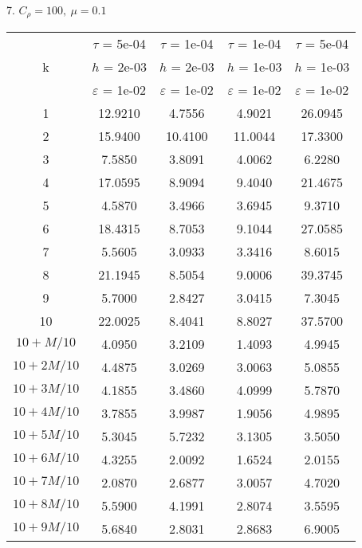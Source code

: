 7. $C_{\rho} = 100, \ \mu = 0.1$
\begin{center}
	\begin{tabular}{ |c|c|c|c|c| } 
		\hline
		& $\tau$ = 5e-04 & $\tau$ = 1e-04 & $\tau$ = 1e-04 & $\tau$ = 5e-04 \\ 
		k & $h$ = 2e-03 & $h$ = 2e-03 & $h$ = 1e-03 & $h$ = 1e-03 \\ 
		& $\varepsilon$ = 1e-02 & $\varepsilon$ = 1e-02 & $\varepsilon$ = 1e-02 & $\varepsilon$ = 1e-02 \\ 
		\hline
		1 & 12.9210 & 4.7556 & 4.9021 & 26.0945 \\
		\hline
		2 & 15.9400 & 10.4100 & 11.0044 & 17.3300 \\
		\hline
		3 & 7.5850 & 3.8091 & 4.0062 & 6.2280 \\
		\hline
		4 & 17.0595 & 8.9094 & 9.4040 & 21.4675 \\
		\hline
		5 & 4.5870 & 3.4966 & 3.6945 & 9.3710 \\
		\hline
		6 & 18.4315 & 8.7053 & 9.1044 & 27.0585 \\
		\hline
		7 & 5.5605 & 3.0933 & 3.3416 & 8.6015 \\
		\hline
		8 & 21.1945 & 8.5054 & 9.0006 & 39.3745 \\
		\hline
		9 & 5.7000 & 2.8427 & 3.0415 & 7.3045 \\
		\hline
		10 & 22.0025 & 8.4041 & 8.8027 & 37.5700 \\
		\hline
		$10 + M/10$ & 4.0950 & 3.2109 & 1.4093 & 4.9945 \\
		\hline
		$10 + 2M/10$ & 4.4875 & 3.0269 & 3.0063 & 5.0855 \\
		\hline
		$10 + 3M/10$ & 4.1855 & 3.4860 & 4.0999 & 5.7870 \\
		\hline
		$10 + 4M/10$ & 3.7855 & 3.9987 & 1.9056 & 4.9895 \\
		\hline
		$10 + 5M/10$ & 5.3045 & 5.7232 & 3.1305 & 3.5050 \\
		\hline
		$10 + 6M/10$ & 4.3255 & 2.0092 & 1.6524 & 2.0155 \\
		\hline
		$10 + 7M/10$ & 2.0870 & 2.6877 & 3.0057 & 4.7020 \\
		\hline
		$10 + 8M/10$ & 5.5900 & 4.1991 & 2.8074 & 3.5595 \\
		\hline
		$10 + 9M/10$ & 5.6840 & 2.8031 & 2.8683 & 6.9005 \\
		\hline
	\end{tabular}
\end{center}

